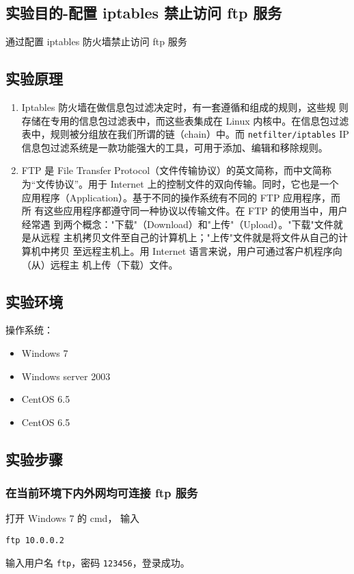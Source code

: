 \subsection{实验目的-配置 iptables 禁止访问 ftp 服务}
通过配置 iptables 防火墙禁止访问 ftp 服务
%
\subsection{实验原理}
\begin{enumerate}
  \item Iptables 防火墙在做信息包过滤决定时，有一套遵循和组成的规则，这些规
    则存储在专用的信息包过滤表中，而这些表集成在 Linux 内核中。在信息包过滤
    表中，规则被分组放在我们所谓的链（chain）中。而 \texttt{netfilter/iptables} IP
    信息包过滤系统是一款功能强大的工具，可用于添加、编辑和移除规则。
  \item FTP 是 File Transfer Protocol（文件传输协议）的英文简称，而中文简称
    为“文传协议”。用于 Internet 上的控制文件的双向传输。同时，它也是一个
    应用程序（Application）。基于不同的操作系统有不同的 FTP 应用程序，而所
    有这些应用程序都遵守同一种协议以传输文件。在 FTP 的使用当中，用户经常遇
    到两个概念："下载"（Download）和"上传"（Upload）。"下载"文件就是从远程
    主机拷贝文件至自己的计算机上；"上传"文件就是将文件从自己的计算机中拷贝
    至远程主机上。用 Internet 语言来说，用户可通过客户机程序向（从）远程主
    机上传（下载）文件。
\end{enumerate}
%
\subsection{实验环境}
操作系统：
\begin{itemize}
  \item Windows 7
  \item Windows server 2003
  \item CentOS 6.5
  \item CentOS 6.5
\end{itemize}
%
\subsection{实验步骤}
\subsubsection{在当前环境下内外网均可连接 ftp 服务}
打开 Windows 7 的 cmd，
输入
\begin{verbatim}
ftp 10.0.0.2
\end{verbatim}
输入用户名 \texttt{ftp}，密码 \texttt{123456}，登录成功。

